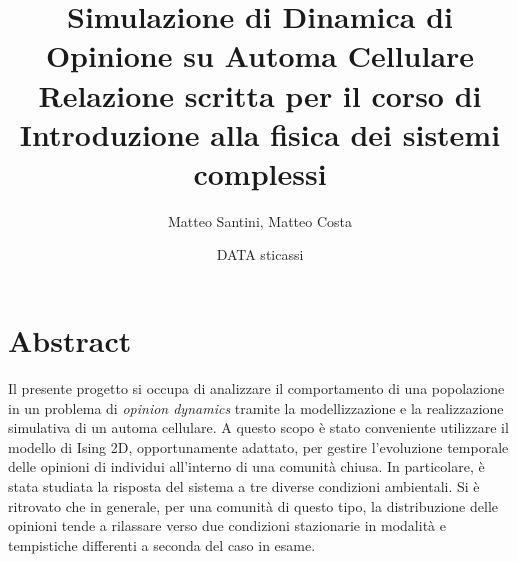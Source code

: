 \documentclass{article}
\begin{document}
\title{\Huge Simulazione di Dinamica di Opinione su Automa Cellulare 
		\[\]\Large Relazione scritta per il corso di \\ Introduzione alla fisica dei sistemi complessi \medskip
		}
\author{Matteo Santini, Matteo Costa}
\date{DATA sticassi}

\maketitle
\tableofcontents
\bigskip

 \section{Abstract}
Il presente progetto si occupa di analizzare il comportamento di una popolazione in un problema di \textit{opinion dynamics} tramite la modellizzazione e la realizzazione simulativa di un automa cellulare. A questo scopo è stato conveniente utilizzare il modello di Ising 2D, opportunamente adattato, per gestire l'evoluzione temporale delle opinioni di individui all'interno di una comunità chiusa. In particolare, è stata studiata la risposta del sistema a tre diverse condizioni ambientali. Si è ritrovato che in generale, per una comunità di questo tipo, la distribuzione delle opinioni tende a rilassare verso due condizioni stazionarie in modalità e tempistiche differenti a seconda del caso in esame.
\end{document}

